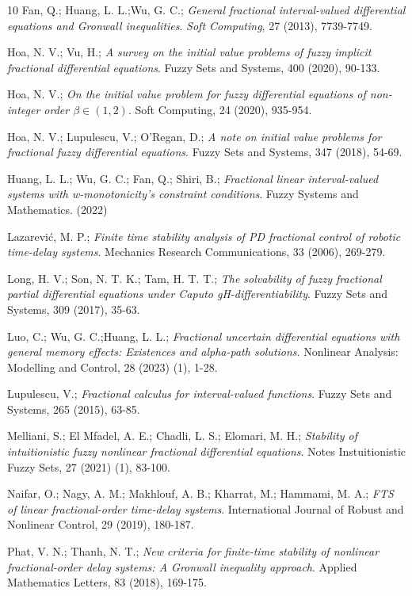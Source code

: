 \documentclass[reqno]{amsart}
\begin{document}
\begin{thebibliography}{10}
Fan, Q.; Huang, L. L.;Wu, G. C.;
\emph{ General fractional interval-valued differential equations and Gronwall
inequalities}. \emph{Soft Computing}, 27 (2013), 7739-7749.

Hoa, N. V.; Vu, H.;
\emph{A survey on the initial value problems of fuzzy implicit fractional
differential equations}. Fuzzy Sets and Systems,  400 (2020), 90-133.

Hoa, N. V.;
\emph{On the initial value problem for fuzzy differential equations of
non-integer order $\beta \in(1,2)$}. Soft Computing, 24 (2020), 935-954.

Hoa, N. V.; Lupulescu, V.; O'Regan, D.;
\emph{A note on initial value problems for fractional fuzzy
differential equations}. Fuzzy Sets and Systems, 347 (2018), 54-69.


Huang, L. L.; Wu, G. C.; Fan, Q.; Shiri, B.;
\emph{Fractional linear interval-valued systems with w-monotonicity's
constraint conditions}. Fuzzy Systems and Mathematics. (2022)

Lazarevi\'c, M. P.;
\emph{Finite time stability analysis of PD fractional control of robotic time-delay
systems}. Mechanics Research Communications, 33 (2006), 269-279.

Long, H. V.; Son, N. T. K.; Tam, H. T. T.;
\emph{The solvability of fuzzy fractional partial differential equations
under Caputo gH-differentiability}. Fuzzy Sets and Systems, 309 (2017), 35-63.

Luo, C.; Wu, G. C.;Huang, L. L.;
\emph{Fractional uncertain differential equations with general memory effects:
Existences and alpha-path solutions}.
Nonlinear Analysis: Modelling and Control, 28 (2023) (1), 1-28.

Lupulescu, V.;
\emph{Fractional calculus for interval-valued functions}.
Fuzzy Sets and Systems, 265 (2015), 63-85.

Melliani, S.; El Mfadel, A. E.; Chadli, L. S.; Elomari, M. H.;
\emph{Stability of intuitionistic fuzzy nonlinear fractional differential 
equations}. Notes Instuitionistic Fuzzy Sets, 27 (2021) (1), 83-100.

Naifar, O.; Nagy, A. M.; Makhlouf, A. B.; Kharrat, M.;  Hammami, M. A.;
\emph{FTS of linear fractional-order time-delay systems}.
International Journal of Robust and Nonlinear Control, 29 (2019), 180-187.

Phat, V. N.; Thanh, N. T.;
\emph{New criteria for finite-time stability of nonlinear fractional-order
delay systems: A Gronwall inequality approach}.
Applied Mathematics Letters, 83 (2018), 169-175.


\end{thebibliography}
\end{document}
